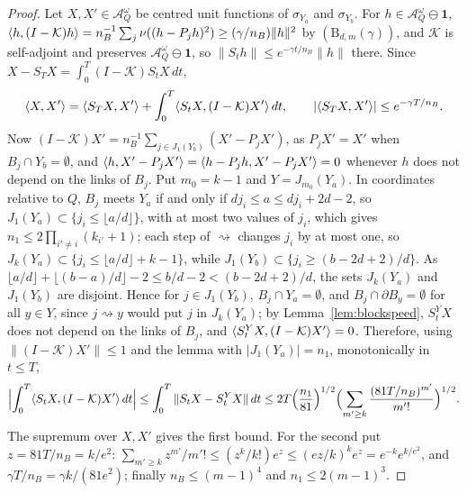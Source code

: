 \begin{proof}
Let $X,X'\in\mathcal A^\omega_Q$ be centred unit functions of $\sigma_{Y_a}$
and $\sigma_{Y_b}$. For $h\in\mathcal A^\omega_Q\ominus\mathbf1$,
$\langle h,(I-\mathcal K)h\rangle=n_B^{-1}\sum_j\nu((h-P_jh)^2)\ge(\gamma/n_B)\|h\|^2$
by $(\mathrm B_{d,m}(\gamma))$, and $\mathcal K$ is self-adjoint and preserves
$\mathcal A^\omega_Q\ominus\mathbf1$, so $\|S_th\|\le e^{-\gamma t/n_B}\|h\|$
there. Since $X-S_TX=\int_0^T(I-\mathcal K)S_tX\,dt$,
\[
\langle X,X'\rangle=\langle S_TX,X'\rangle+\int_0^T\langle S_tX,(I-\mathcal K)X'\rangle\,dt,\qquad
|\langle S_TX,X'\rangle|\le e^{-\gamma T/n_B}.
\]
Now $(I-\mathcal K)X'=n_B^{-1}\sum_{j\in J_1(Y_b)}(X'-P_jX')$, as $P_jX'=X'$
when $B_j\cap Y_b=\emptyset$, and $\langle h,X'-P_jX'\rangle=\langle h-P_jh,X'-P_jX'\rangle=0$
whenever $h$ does not depend on the links of $B_j$. Put $m_0=k-1$ and $Y=
J_{m_0}(Y_a)$. In coordinates relative to $Q$, $B_j$ meets $Y_a$ if and only
if $dj_i\le a\le dj_i+2d-2$, so $J_1(Y_a)\subset\{j_i\le\lfloor a/d\rfloor\}$,
with at most two values of $j_i$, which gives $n_1\le2\prod_{i'\ne i}(k_{i'}+1)$;
each step of $\rightsquigarrow$ changes $j_i$ by at most one, so $J_k(Y_a)
\subset\{j_i\le\lfloor a/d\rfloor+k-1\}$, while $J_1(Y_b)\subset\{j_i\ge
(b-2d+2)/d\}$. As $\lfloor a/d\rfloor+\lfloor(b-a)/d\rfloor-2\le b/d-2<
(b-2d+2)/d$, the sets $J_k(Y_a)$ and $J_1(Y_b)$ are disjoint. Hence for $j\in
J_1(Y_b)$, $B_j\cap Y_a=\emptyset$, and $B_j\cap\partial B_y=\emptyset$ for
all $y\in Y$, since $j\rightsquigarrow y$ would put $j$ in $J_k(Y_a)$; by
Lemma~\ref{lem:blockspeed}, $S^Y_tX$ does not depend on the links of $B_j$,
and $\langle S^Y_tX,(I-\mathcal K)X'\rangle=0$. Therefore, using $\|(I-\mathcal K)X'\|
\le1$ and the lemma with $|J_1(Y_a)|=n_1$, monotonically in $t\le T$,
\[
\Bigl|\int_0^T\langle S_tX,(I-\mathcal K)X'\rangle\,dt\Bigr|\le\int_0^T\|S_tX-S^Y_tX\|
\,dt\le2T\Bigl(\frac{n_1}{81}\Bigr)^{1/2}\Bigl(\sum_{m'\ge k}\frac{(81T/n_B)
^{m'}}{m'!}\Bigr)^{1/2}.
\]
The supremum over $X,X'$ gives the first bound. For the second put $z=81T/
n_B=k/e^2$: $\sum_{m'\ge k}z^{m'}/m'!\le(z^k/k!)e^z\le(ez/k)^ke^z=e^{-k}
e^{k/e^2}$, and $\gamma T/n_B=\gamma k/(81e^2)$; finally $n_B\le(m-1)^4$ and
$n_1\le2(m-1)^3$.
\end{proof}

